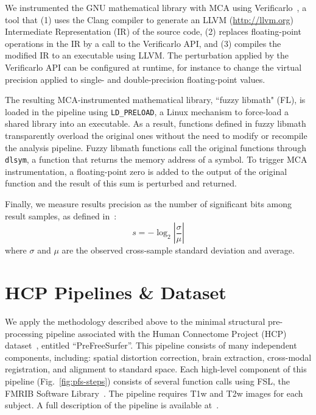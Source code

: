 We instrumented the GNU mathematical library with MCA using
Verificarlo~\cite{denis2015verificarlo}, a tool that (1) uses the Clang
compiler to generate an LLVM (\url{http://llvm.org}) Intermediate
Representation (IR) of the source code, (2) replaces floating-point operations
in the IR by a call to the Verificarlo API, and (3) compiles the modified IR to
an executable using LLVM. The perturbation applied by the Verificarlo API
can be configured at runtime, for instance to change the virtual
precision applied to single- and double-precision floating-point values.

The resulting MCA-instrumented mathematical library, ``fuzzy libmath" (FL), is
loaded in the pipeline using \texttt{LD\_PRELOAD}, a Linux mechanism to
force-load a shared library into an executable. As a result, functions defined in fuzzy libmath
transparently overload the original ones without the need to modify
or recompile the analysis pipeline. Fuzzy libmath functions call the original
functions through \texttt{dlsym}, a function that returns the memory address of
a symbol. To trigger MCA instrumentation, a floating-point zero is added to the
output of the original function and the result of this sum is perturbed and
returned.


Finally, we measure results precision as the number of significant bits among result samples, as
defined in~\cite{Parker1997-qq}:
\begin{equation}
  s = -\log_2\left|\frac{\sigma}{\mu}\right|
  \label{estimatesig}
\end{equation}
where $\sigma$ and $\mu$ are the observed cross-sample standard deviation and average.


\section{HCP Pipelines \& Dataset}

We apply the methodology described above to the minimal structural
pre-processing pipeline associated with the Human Connectome Project (HCP)
dataset~\cite{glasser2013}, entitled ``PreFreeSurfer''. This pipeline
consists of many independent components, including: spatial distortion
correction, brain extraction, cross-modal registration, and alignment to standard space. Each high-level component of this pipeline
(Fig.~\ref{fig:pfs-steps}) consists of several function calls using FSL, the FMRIB Software Library~\cite{jenkinson2012fsl}.
 The pipeline requires T1w and T2w images for each subject. A
full description of the pipeline is available
at~\cite{glasser2013}.

